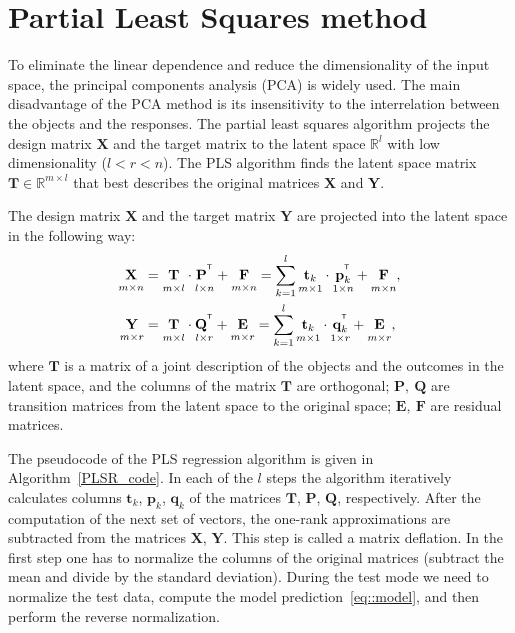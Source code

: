 \documentclass[runningheads]{llncs}
\newcommand{\bY}{\mathbf{Y}}
\newcommand{\bX}{\mathbf{X}}
\newcommand{\bt}{\mathbf{t}}
\newcommand{\bp}{\mathbf{p}}
\newcommand{\bq}{\mathbf{q}}
\newcommand{\bP}{\mathbf{P}}
\newcommand{\bT}{\mathbf{T}}
\newcommand{\bQ}{\mathbf{Q}}
\newcommand{\bE}{\mathbf{E}}
\newcommand{\bF}{\mathbf{F}}
\newcommand{\T}{^{\text{\tiny\sffamily\upshape\mdseries T}}}
\begin{document}
\section{Partial Least Squares method}
\label{sec:pls}
To eliminate the linear dependence and reduce the dimensionality of the input space, the principal components analysis (PCA) is widely used. 
The main disadvantage of the PCA method is its insensitivity to the interrelation between the objects and the responses.
The partial least squares algorithm projects the design matrix $\bX$ and the target matrix to the latent space $\mathbb{R}^l$ with low dimensionality ($l < r < n$).
The PLS algorithm finds the latent space matrix $\bT \in \mathbb{R}^{m \times l}$ that best describes the original matrices $\bX$ and $\bY$.

The design matrix $\bX$ and the target matrix $\bY$ are projected into the latent space in the following way:
\begin{align}
\label{eq::PLS_X}
 \underset{m \times n}{\vphantom{\bQ}\bX} 
 &= \underset{m \times l}{\vphantom{\bQ}\bT} \cdot \underset{l \times n}{\vphantom{\bQ}\bP^{\T}} + \underset{m \times n}{\vphantom{\bQ}\bF} 
 = \sum_{k=1}^l \underset{m \times 1}{\vphantom{\bp_k^{\T}}\bt_k} \cdot \underset{1 \times n}{\bp_k^{\T}} + \underset{m \times n}{\vphantom{\bp_k^{\T}}\bF},\\
 \label{eq::PLS_Y}
 \underset{m \times r}{\vphantom{\bQ}\bY} 
 &= \underset{m \times l}{\vphantom{\bQ}\bT} \cdot \underset{l \times r}{\bQ^{\T}} + \underset{m \times r}{\vphantom{\bQ}\bE}
 =  \sum_{k=1}^l  \underset{m \times 1}{\vphantom{\bq_k^{\T}}\bt_k} \cdot \underset{1 \times r}{\bq_k^{\T}} +  \underset{m \times r}{\vphantom{\bq_k^{\T}}\bE},
\end{align}
where $\bT$ is a matrix of a joint description of the objects and the outcomes in the latent space, and the columns of the matrix $\bT$ are orthogonal; $\bP,\ \bQ$ are transition matrices from the latent space to the original space; $\bE,\ \bF$ are residual matrices.

The pseudocode of the PLS regression algorithm is given in Algorithm~\ref{PLSR_code}.
In each of the $l$ steps the algorithm iteratively calculates columns $\bt_k$, $\bp_k$, $\bq_k$ of the matrices $\bT$, $\bP$, $\bQ$, respectively. 
After the computation of the next set of vectors, the one-rank approximations are subtracted from the matrices $\bX$, $\bY$. 
This step is called a matrix deflation.
In the first step one has to normalize the columns of the original matrices (subtract the mean and divide by the standard deviation).
During the test mode we need to normalize the test data, compute the model prediction~\eqref{eq::model}, and then perform the reverse normalization.
\end{document}
